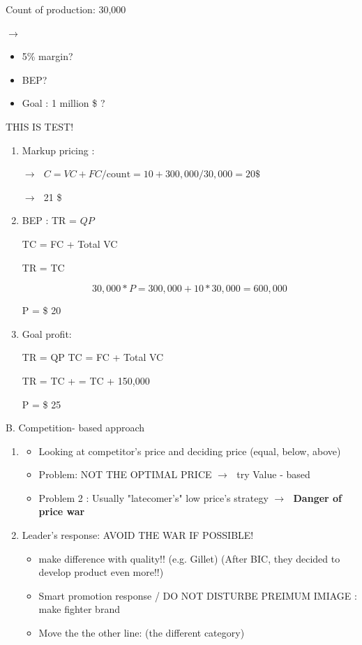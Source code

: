 \documentclass[12pt]{article}
\newcommand{\ra}{$\rightarrow \text{ }$}
\newcommand{\tb}{\textbf}
\begin{document}
\begin{itemize}
\begin{tcolorbox}
	Count of production: 30,000

\end{tcolorbox}

\ra

\begin{tcolorbox}

\begin{itemize}
	\item 5\% margin?
	\item BEP?
	\item Goal : 1 million  \$ ?
\end{itemize}

\end{tcolorbox}

 THIS IS TEST!
\begin{enumerate}
	\item Markup pricing :

	\ra $ C= VC + FC/ \text{count} = 10 + 300,000/30,000 = 20 \text{\$} $

	\ra 21 \$

	\item BEP :
	TR = $QP$

	TC = FC + Total VC

	TR = TC

	\[
	30,000 * P = 300,000 + 10 * 30,000 = 600,000
	\]

	P = \$ 20
	\item Goal profit:

	TR = QP
	TC = FC + Total VC

	TR = TC + \pi = TC + 150,000

	P = \$ 25
\end{enumerate}


B. Competition- based approach
\begin{enumerate}
	\item
	\begin{itemize}
		\item Looking at competitor's price and deciding price (equal, below, above)
		\item Problem: NOT THE OPTIMAL PRICE \ra try Value - based
		\item Problem 2 : Usually "latecomer's" low price's strategy \ra \tb{Danger of price war}
	\end{itemize}
	\item Leader's response: AVOID THE WAR IF POSSIBLE!
	\begin{itemize}
		\item make difference with quality!! (e.g. Gillet) (After BIC, they decided to develop product even more!!)
		\item Smart promotion response / DO NOT DISTURBE PREIMUM IMIAGE : make fighter brand
		\item Move the the other line: (the different category)
	\end{itemize}
\end{enumerate}


\end{itemize}
\end{document}
